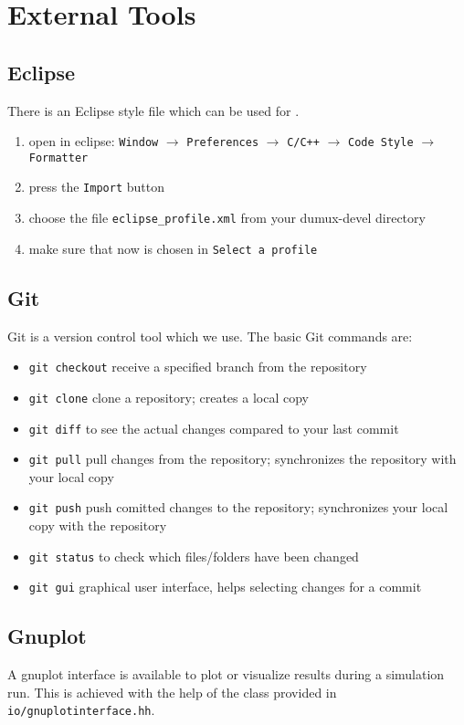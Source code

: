 \section{External Tools}
\label{sc_externaltools}

\subsection{Eclipse}
There is an Eclipse style file which can be used for \Dumux.
\begin{enumerate}
  \item open in eclipse: \texttt{Window} $\rightarrow$ \texttt{Preferences} $\rightarrow$
        \texttt{C/C++}  $\rightarrow$ \texttt{Code Style} $\rightarrow$ \texttt{Formatter}
  \item press the \texttt{Import} button
  \item choose the file \texttt{eclipse\_profile.xml} from your dumux-devel directory
  \item make sure that now \Dumux is chosen in \texttt{Select a profile}
\end{enumerate}


\subsection{Git}
Git is a version control tool which we use.
The basic Git commands are:
\begin{itemize}
  \item \texttt{git checkout} receive a specified branch from the repository
  \item \texttt{git clone} clone a repository; creates a local copy
  \item \texttt{git diff} to see the actual changes compared to your last commit
  \item \texttt{git pull} pull changes from the repository; synchronizes the
  repository with your local copy
  \item \texttt{git push} push comitted changes to the repository;  synchronizes
  your local copy with the repository
  \item \texttt{git status} to check which files/folders have been changed
  \item \texttt{git gui} graphical user interface, helps selecting changes for
  a commit
\end{itemize}


\subsection{Gnuplot}
\label{gnuplot}
A gnuplot interface is available to plot or visualize results during a simulation run.
This is achieved with the help of the class provided in \texttt{io/gnuplotinterface.hh}.


